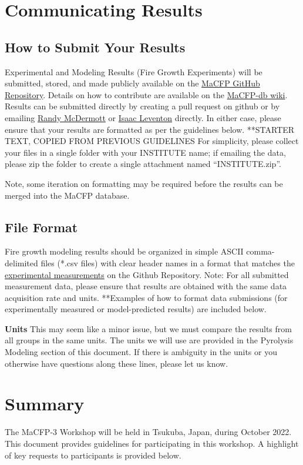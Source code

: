 \documentclass[12pt,demo]{article}
\begin{document}
\clearpage
\section{Communicating Results}
\subsection{How to Submit Your Results}
Experimental and Modeling Results (Fire Growth Experiments) will be submitted, stored, and made publicly available on the \href{https://github.com/MaCFP/macfp-db/Fire_Growth}{MaCFP GitHub Repository}. Details on how to contribute are available on the \href{https://github.com/MaCFP/macfp-db/wiki/How-to-Contribute}{MaCFP-db wiki}. Results can be submitted directly by creating a pull request on github or by emailing \href{mailto:randy.mcdermott@gmail.com}{Randy McDermott} or \href{mailto:isaac.leventon@gmail.com}{Isaac Leventon} directly. In either case, please ensure that your results are formatted as per the guidelines below.
**STARTER TEXT, COPIED FROM PREVIOUS GUIDELINES
For simplicity, please collect your files in a single folder with your INSTITUTE name; if emailing the data, please zip the folder to create a single attachment named “INSTITUTE.zip”. 

Note, some iteration on formatting may be required before the results can be merged into the MaCFP database.
\subsection{File Format}
Fire growth modeling results should be organized in simple ASCII comma-delimited files (*.csv files) with clear header names in a format that matches the \href{https://github.com/MaCFP/macfp-db/tree/master/Fire_Growth}{experimental measurements} on the Github Repository. Note: For all submitted measurement data, please ensure that results are obtained with the same data acquisition rate and units. **Examples of how to format data submissions (for experimentally measured or model-predicted results) are included below.

\textbf{Units}
This may seem like a minor issue, but we must compare the results from all groups in the same units. The units we will use are provided in the Pyrolysis Modeling section of this document. If there is ambiguity in the units or you otherwise have questions along these lines, please let us know.

\clearpage
\section{Summary}
The MaCFP-3 Workshop will be held in Tsukuba, Japan, during October 2022. This document provides guidelines for participating in this workshop. A highlight of key requests to participants is provided below.
\end{document}
